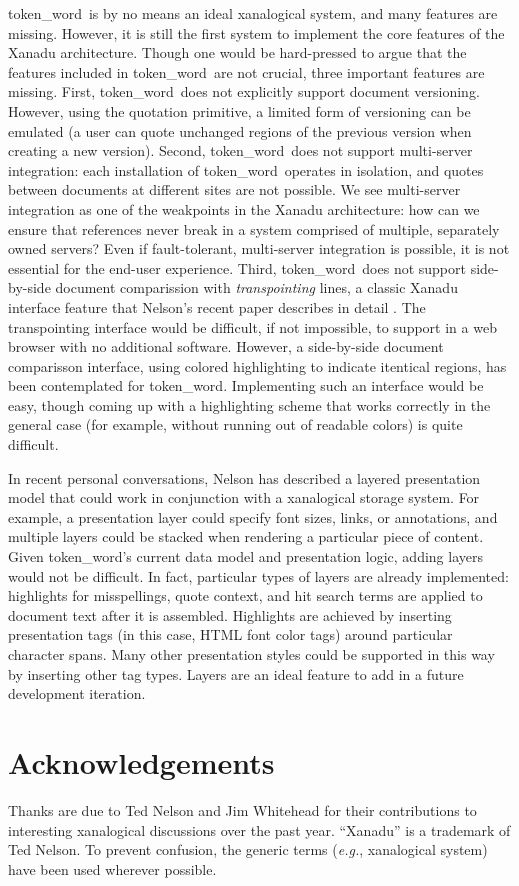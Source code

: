 \documentclass{acm_proc_article-sp}
\newcommand{\tw}{token\_word}
\begin{document}
\tw \  is by no means an ideal xanalogical system, and many features are missing.
However, it is still the first system to implement the core features of the Xanadu architecture.
Though one would be hard-pressed to argue that the features included in \tw \  are not crucial, three important features are missing.
First, \tw \  does not explicitly support document versioning.
However, using the quotation primitive, a limited form of versioning can be emulated (a user can quote unchanged regions of the previous version when creating a new version).
Second, \tw \  does not support multi-server integration:  each installation of \tw \  operates in isolation, and quotes between documents at different sites are not possible.
We see multi-server integration as one of the weakpoints in the Xanadu architecture:  how can we ensure that references never break in a system comprised of multiple, separately owned servers?
Even if fault-tolerant, multi-server integration is possible, it is not essential for the end-user experience. 
Third, \tw \   does not support side-by-side document comparission with {\it transpointing} lines, a classic Xanadu interface feature that Nelson's recent paper describes in detail \cite{Nelson1999}.
The transpointing interface would be difficult, if not impossible, to support in a web browser with no additional software.
However, a side-by-side document comparisson interface, using colored highlighting to indicate itentical regions, has been contemplated for \tw.
Implementing such an interface would be easy, though coming up with a highlighting scheme that works correctly in the general case (for example, without running out of readable colors) is quite difficult.

In recent personal conversations, Nelson has described a layered presentation model that could work in conjunction with a xanalogical storage system.
For example, a presentation layer could specify font sizes, links, or annotations, and multiple layers could be stacked when rendering a particular piece of content.
Given \tw's current data model and presentation logic, adding layers would not be difficult.
In fact, particular types of layers are already implemented:  highlights for misspellings, quote context, and hit search terms are applied to document text after it is assembled.
Highlights are achieved by inserting presentation tags (in this case, HTML font color tags) around particular character spans.
Many other presentation styles could be supported in this way by inserting other tag types.
Layers are an ideal feature to add in a future development iteration.

\section{Acknowledgements}
Thanks are due to Ted Nelson and Jim Whitehead for their contributions to interesting xanalogical discussions over the past year. ``Xanadu'' is a trademark of Ted Nelson.  To prevent confusion, the generic terms ({\it e.g.}, xanalogical system) have been used wherever possible.



\end{document}
